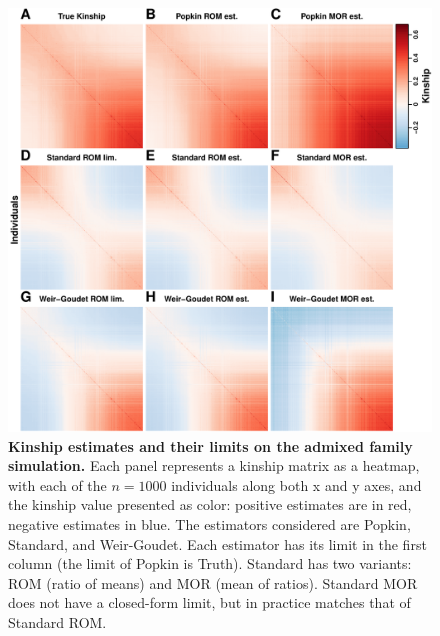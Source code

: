 \documentclass[11pt]{article}
\begin{document}
\begin{figure}[bp!]
  \centering
  \includegraphics[height=0.8\textheight]{kinship.pdf}
  \caption{
    {\bf Kinship estimates and their limits on the admixed family simulation.}
    Each panel represents a kinship matrix as a heatmap, with each of the $n=1000$ individuals along both x and y axes, and the kinship value presented as color: positive estimates are in red, negative estimates in blue.
    The estimators considered are Popkin, Standard, and Weir-Goudet.
    Each estimator has its limit in the first column (the limit of Popkin is Truth).
    Standard has two variants: ROM (ratio of means) and MOR (mean of ratios).
    Standard MOR does not have a closed-form limit, but in practice matches that of Standard ROM.
  }
  \label{fig:kinship_sim}
\end{figure}
\end{document}
